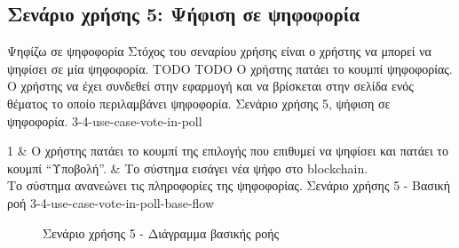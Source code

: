 \subsection{Σενάριο χρήσης 5: Ψήφιση σε ψηφοφορία} \label{subsection:3-4-use-case-vote-in-poll}

\useCaseTable
{Ψηφίζω σε ψηφοφορία}
{Στόχος του σεναρίου χρήσης είναι ο χρήστης να μπορεί να ψηφίσει σε μία ψηφοφορία.}
{TODO}
{TODO}
{Ο χρήστης πατάει το κουμπί ψηφοφορίας.}
{Ο χρήστης να έχει συνδεθεί στην εφαρμογή και να βρίσκεται στην σελίδα ενός θέματος το οποίο περιλαμβάνει ψηφοφορία.}
{Σενάριο χρήσης 5, ψήφιση σε ψηφοφορία.}
{3-4-use-case-vote-in-poll}

\useCaseBaseFlowTable
{
    1 & Ο χρήστης πατάει το κουμπί της επιλογής που επιθυμεί να ψηφίσει και πατάει το κουμπί ``Υποβολή''. & Το σύστημα εισάγει νέα ψήφο στο blockchain. \\ [0.5ex]
}
{Το σύστημα ανανεώνει τις πληροφορίες της ψηφοφορίας.}
{Σενάριο χρήσης 5 - Βασική ροή}
{3-4-use-case-vote-in-poll-base-flow}

\begin{figure}[H]
    \centering
    
    \caption{Σενάριο χρήσης 5 - Διάγραμμα βασικής ροής}
    \label{figure:3-4-use-case-vote-in-poll-base-flow-sequence-diagram}
\end{figure}

